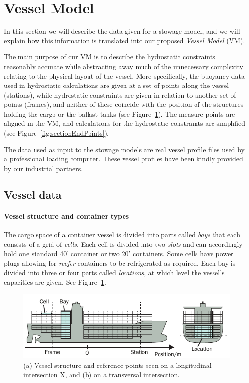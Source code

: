 %

%
\section{Vessel Model}
In this section we will describe the data given for a stowage model, and we will explain how this information is translated into our proposed \emph{Vessel Model} (VM).

The main purpose of our VM is to 
{describe the hydrostatic constraints reasonably accurate while}
abstracting away much of the unnecessary complexity relating to the physical layout of the vessel. 
More specifically, the buoyancy data used in hydrostatic calculations are given at a set of points along the vessel (stations), while hydrostatic constraints are given in relation to another set of points (frames), and neither of these coincide with the position of the structures holding the cargo or the ballast tanks (see Figure~\ref{fig:vessel}). The measure points are aligned in the VM, and calculations for the hydrostatic constraints are simplified (see Figure~\ref{fig:sectionEndPoints}).

The data used as input to the stowage models are real vessel profile files used by a professional loading computer. These vessel profiles have been kindly provided by our industrial partners.

\subsection*{Vessel data}
\paragraph{Vessel structure and container types}
The cargo space of a container vessel is divided into parts called \textit{bays} that each consists of a grid of \emph{cells}. Each cell is divided into two \emph{slots} and can accordingly hold one standard 40' container or two 20' containers. Some cells have power plugs allowing for \emph{reefer} containers to be refrigerated as required. Each bay is divided into three or four parts called \textit{locations}, at which level the vessel's capacities are given. See Figure~\ref{fig:vessel}.

\begin{figure}[hb]
	\centering
		\includegraphics{figures/vessel2.pdf}
	\caption{(a) Vessel structure and reference points seen on a longitudinal intersection X, and (b) on a transversal intersection.}
	\label{fig:vessel}
\end{figure}

